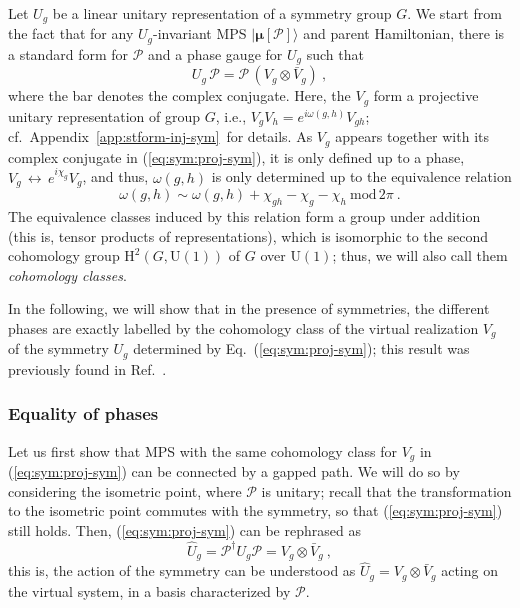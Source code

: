 \documentclass[twocolumn,superscriptaddress,prb,linenumbers]{revtex4-1}
\newcommand{\MPS}[1]{| {\bm\mu}[#1]\rangle}
\newcommand{\mc}[1]{\mathcal{#1}}
\newcommand{\sss}[1]{\subsubsection{#1}}
\begin{document}
Let $U_g$ be a linear unitary representation of a symmetry group $G$.  We
start from the fact that for any $U_g$-invariant MPS $\MPS{\mc P}$ and
parent Hamiltonian, there is a standard form for $\mc P$ and a phase
gauge for $U_g$ such that
\begin{equation}
    \label{eq:sym:proj-sym}
    U_g\,\mc P =  \mc P \,
    (V_g\otimes \bar V_g)\ ,
\end{equation}
where the bar denotes the complex conjugate.\cite{david:stringorder-1d}
Here, the $V_g$ form a projective unitary representation of group $G$,
i.e., $V_g V_h = e^{i\omega(g,h)} V_{gh}$;
cf.~Appendix~\ref{app:stform-inj-sym}\ for details.  As $V_g$ appears
together with its complex conjugate in (\ref{eq:sym:proj-sym}), it is only
defined up to a phase, $V_g\,\leftrightarrow\, e^{i\chi_g}V_g$, and thus,
$\omega(g,h)$ is only determined up to the equivalence relation
\[
    \omega(g,h)\sim \omega(g,h) +\chi_{gh}-\chi_g-\chi_h\ \mathrm{mod}\,2\pi\ .
\]
The equivalence classes induced by this relation form a group under
addition (this is, tensor products of representations), which is
isomorphic to the second cohomology group $\mathrm{H}^2(G,\mathrm{U}(1))$ of
$G$ over $\mathrm{U}(1)$; thus, we will also call them \emph{cohomology
    classes}.

In the following, we will show that in the presence of symmetries, the
different phases are exactly labelled by the cohomology class of the virtual
realization $V_g$ of the symmetry $U_g$ determined by
Eq.~(\ref{eq:sym:proj-sym}); this result was previously found in
Ref.~.






\sss{Equality of phases}

Let us first show that MPS with the same cohomology class for $V_g$ in
(\ref{eq:sym:proj-sym}) can be connected by a gapped path.  We will do so
by considering the isometric point, where $\mc P$ is unitary;
recall that the transformation to the isometric point commutes with the
symmetry, so that (\ref{eq:sym:proj-sym}) still holds.
Then, (\ref{eq:sym:proj-sym}) can be rephrased as
\[
    \hat U_g =  \mc P^\dagger U_g \mc P =
    V_g\otimes \bar V_g\ ,
\]
this is, the action of the symmetry can be understood as $\hat U_g =
    V_g\otimes \bar V_g$ acting on the virtual system, in a basis
characterized by $\mc P$.
\end{document}
